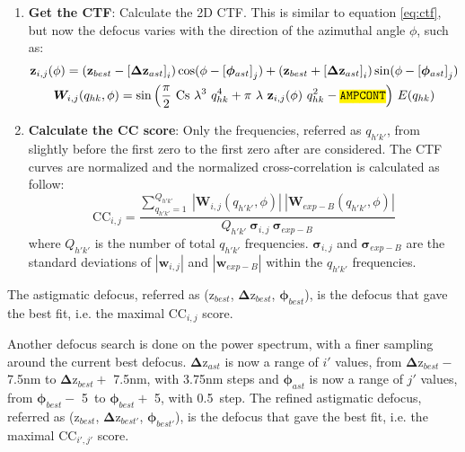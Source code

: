 \begin{enumerate}
    \item \textbf{Get the CTF}: Calculate the 2D CTF. This is similar to equation \ref{eq:ctf}, but now the defocus varies with the direction of the azimuthal angle $\phi$, such as:
    \begin{gather}
        \bm{\mathrm{z}}_{i,j}(\phi) = (\bm{\mathrm{z}}_{best} - {[\bm{\Delta \mathrm{z}}_{ast}]}_i) \cos(\phi - {[\bm{\phi}_{ast}]}_j) + (\bm{\mathrm{z}}_{best} + {[\bm{\Delta \mathrm{z}}_{ast}]}_i) \sin(\phi - {[\bm{\phi}_{ast}]}_j)\notag\\
        \bm{W}_{i,j}(q_{hk},\phi) = \sin{ \left( \frac{\pi}{2}\ \mathrm{Cs}\ \lambda^3\ q_{hk}^4 + \pi\ \lambda\ \bm{\mathrm{z}}_{i,j}(\phi)\ q_{hk}^2 - \code{AMPCONT} \right)}\ E(q_{hk})\label{eq:ctf2}
    \end{gather}

    \item \textbf{Calculate the CC score}: Only the frequencies, referred as $q_{h'k'}$, from slightly before the first zero to the first zero after  are considered. The CTF curves are normalized and the normalized cross-correlation is calculated as follow:
    \begin{equation}
        \bm{\mathrm{CC}}_{i,j} = \frac{
                \sum_{q_{h'k'}=1}^{Q_{h'k'}}\ |\bm{W}_{i,j}(q_{h'k'},\phi)|\ |\bm{W}_{exp-B}(q_{h'k'},\phi)|
                }{ Q_{h'k'}\ \bm{\sigma}_{i,j}\ \bm{\sigma}_{exp-B} }
    \end{equation}
        where $Q_{h'k'}$ is the number of total $q_{h'k'}$ frequencies. $\bm{\sigma}_{i,j}$ and $\bm{\sigma}_{exp-B}$ are the standard deviations of $|\bm{w}_{i,j}|$ and $|\bm{w}_{exp-B}|$ within the $q_{h'k'}$ frequencies.
\end{enumerate}
    
The astigmatic defocus, referred as ($\bm{\mathrm{z}}_{best}$, $\bm{\Delta\mathrm{z}}_{best}$, $\bm{\phi}_{best}$), is the defocus that gave the best fit, i.e. the maximal $\bm{\mathrm{CC}}_{i,j}$ score.
    
Another defocus search is done on the power spectrum, with a finer sampling around the current best defocus. $\bm{\Delta\mathrm{z}}_{ast}$ is now a range of $i'$ values, from $\bm{\Delta\mathrm{z}}_{best}-$ 7.5nm to $\bm{\Delta\mathrm{z}}_{best}+$ 7.5nm, with 3.75nm steps and $\bm{\phi}_{ast}$ is now a range of $j'$ values, from $\bm{\phi}_{best}-$ 5\textdegree\ to $\bm{\phi}_{best}+$ 5\textdegree, with 0.5\textdegree\ step. The refined astigmatic defocus, referred as ($\bm{\mathrm{z}}_{best}$, $\bm{\Delta\mathrm{z}}_{best'}$, $\bm{\phi}_{best'}$), is the defocus that gave the best fit, i.e. the maximal $\bm{\mathrm{CC}}_{i',j'}$ score.

